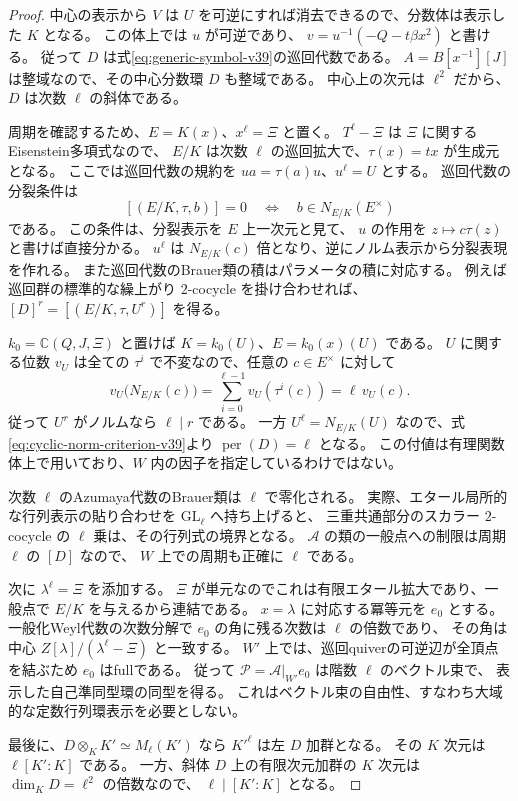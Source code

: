 \begin{proof}
中心の表示から $V$ は $U$ を可逆にすれば消去できるので、分数体は表示した $K$ となる。
この体上では $u$ が可逆であり、
$v=u^{-1}(-Q-t\beta x^2)$ と書ける。
従って $D$ は式\eqref{eq:generic-symbol-v39}の巡回代数である。
$A=B[x^{-1}][J]$ は整域なので、その中心分数環 $D$ も整域である。
中心上の次元は $\ell^2$ だから、$D$ は次数 $\ell$ の斜体である。

周期を確認するため、$E=K(x)$、$x^\ell=\Xi$ と置く。
$T^\ell-\Xi$ は $\Xi$ に関するEisenstein多項式なので、
$E/K$ は次数 $\ell$ の巡回拡大で、$\tau(x)=tx$ が生成元となる。
ここでは巡回代数の規約を $ua=\tau(a)u$、$u^\ell=U$ とする。
巡回代数の分裂条件は
\begin{equation}
\label{eq:cyclic-norm-criterion-v39}
 [(E/K,\tau,b)]=0
 \quad\Longleftrightarrow\quad b\in N_{E/K}(E^\times)
\end{equation}
である\cite[\S1, equation~(2)]{MinacSchultzSwallowDescent39}。
この条件は、分裂表示を $E$ 上一次元と見て、
$u$ の作用を $z\mapsto c\tau(z)$ と書けば直接分かる。
$u^\ell$ は $N_{E/K}(c)$ 倍となり、逆にノルム表示から分裂表現を作れる。
また巡回代数のBrauer類の積はパラメータの積に対応する。
例えば巡回群の標準的な繰上がり $2$-cocycle を掛け合わせれば、
$[D]^r=[(E/K,\tau,U^r)]$ を得る。

$k_0=\mathbb C(Q,J,\Xi)$ と置けば $K=k_0(U)$、$E=k_0(x)(U)$ である。
$U$ に関する位数 $v_U$ は全ての $\tau^i$ で不変なので、任意の $c\in E^\times$ に対して
\[
 v_U\bigl(N_{E/K}(c)\bigr)
 =\sum_{i=0}^{\ell-1}v_U(\tau^i(c))
 =\ell\,v_U(c).
\]
従って $U^r$ がノルムなら $\ell\mid r$ である。
一方 $U^\ell=N_{E/K}(U)$ なので、式\eqref{eq:cyclic-norm-criterion-v39}より
$\operatorname{per}(D)=\ell$ となる。
この付値は有理関数体上で用いており、$W$ 内の因子を指定しているわけではない。

次数 $\ell$ のAzumaya代数のBrauer類は $\ell$ で零化される。
実際、エタール局所的な行列表示の貼り合わせを $\mathrm{GL}_\ell$ へ持ち上げると、
三重共通部分のスカラー $2$-cocycle の $\ell$ 乗は、その行列式の境界となる。
$\mathcal A$ の類の一般点への制限は周期 $\ell$ の $[D]$ なので、
$W$ 上での周期も正確に $\ell$ である。

次に $\lambda^\ell=\Xi$ を添加する。
$\Xi$ が単元なのでこれは有限エタール拡大であり、一般点で $E/K$ を与えるから連結である。
$x=\lambda$ に対応する冪等元を $e_0$ とする。
一般化Weyl代数の次数分解で $e_0$ の角に残る次数は $\ell$ の倍数であり、
その角は中心 $Z[\lambda]/(\lambda^\ell-\Xi)$ と一致する。
$W'$ 上では、巡回quiverの可逆辺が全頂点を結ぶため $e_0$ はfullである。
従って $\mathcal P=\mathcal A|_{W'}e_0$ は階数 $\ell$ のベクトル束で、
表示した自己準同型環の同型を得る。
これはベクトル束の自由性、すなわち大域的な定数行列環表示を必要としない。

最後に、$D\otimes_KK'\simeq M_\ell(K')$ なら $K'^\ell$ は左 $D$ 加群となる。
その $K$ 次元は $\ell[K':K]$ である。
一方、斜体 $D$ 上の有限次元加群の $K$ 次元は $\dim_KD=\ell^2$ の倍数なので、
$\ell\mid[K':K]$ となる。
\end{proof}


